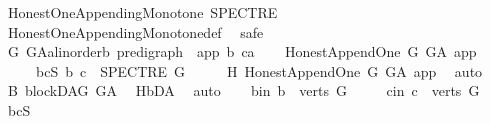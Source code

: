 \begin{isabellebody}
{\isafoldproof}%
%
\isadelimproof
\isanewline
%
\endisadelimproof
\isanewline
{}\isamarkupfalse%
\ {\isachardoublequoteopen}Honest{\isacharunderscore}{\kern0pt}One{\isacharunderscore}{\kern0pt}Appending{\isacharunderscore}{\kern0pt}Monotone\ SPECTRE{\isachardoublequoteclose}\isanewline
%
\isadelimproof
\ \ %
\endisadelimproof
%
\isatagproof
{}\isamarkupfalse%
\ Honest{\isacharunderscore}{\kern0pt}One{\isacharunderscore}{\kern0pt}Appending{\isacharunderscore}{\kern0pt}Monotone{\isacharunderscore}{\kern0pt}def\ \isanewline
{}\isamarkupfalse%
\ safe\isanewline
\ \ \isamarkupfalse%
\ G\ G{\isacharunderscore}{\kern0pt}A{\isacharcolon}{\kern0pt}{\isacharcolon}{\kern0pt}{\isachardoublequoteopen}{\isacharparenleft}{\kern0pt}{\isacharprime}{\kern0pt}a{\isacharcolon}{\kern0pt}{\isacharcolon}{\kern0pt}linorder{\isacharcomma}{\kern0pt}{\isacharprime}{\kern0pt}b{\isacharparenright}{\kern0pt}\ pre{\isacharunderscore}{\kern0pt}digraph{\isachardoublequoteclose}\ \ app\ b\ c{\isacharcolon}{\kern0pt}{\isacharcolon}{\kern0pt}{\isacharprime}{\kern0pt}a\isanewline
\ \ \isamarkupfalse%
\ {\isachardoublequoteopen}Honest{\isacharunderscore}{\kern0pt}Append{\isacharunderscore}{\kern0pt}One\ G\ G{\isacharunderscore}{\kern0pt}A\ app{\isachardoublequoteclose}\isanewline
\ \ \ \ \ bcS{\isacharcolon}{\kern0pt}\ {\isachardoublequoteopen}{\isacharparenleft}{\kern0pt}b{\isacharcomma}{\kern0pt}\ c{\isacharparenright}{\kern0pt}\ {\isasymin}\ SPECTRE\ G{\isachardoublequoteclose}\isanewline
\ \ \isamarkupfalse%
\ \isamarkupfalse%
\ H{}{\isacharcolon}{\kern0pt}\ Honest{\isacharunderscore}{\kern0pt}Append{\isacharunderscore}{\kern0pt}One\ G\ G{\isacharunderscore}{\kern0pt}A\ app\ \isamarkupfalse%
\ auto\isanewline
\ \ \isamarkupfalse%
\ B{}{\isacharcolon}{\kern0pt}\ blockDAG\ G{\isacharunderscore}{\kern0pt}A\ \isamarkupfalse%
\ H{}{\isachardot}{\kern0pt}bD{\isacharunderscore}{\kern0pt}A\ \isamarkupfalse%
\ auto\isanewline
\ \ \isamarkupfalse%
\ b{\isacharunderscore}{\kern0pt}in{\isacharcolon}{\kern0pt}\ {\isachardoublequoteopen}b\ {\isasymin}\ verts\ G{\isachardoublequoteclose}\isanewline
\ \ \ \ \ c{\isacharunderscore}{\kern0pt}in{\isacharcolon}{\kern0pt}\ {\isachardoublequoteopen}c\ {\isasymin}\ verts\ G{\isachardoublequoteclose}\ \isamarkupfalse%
\ bcS\ \isamarkupfalse%

\end{isabellebody}
